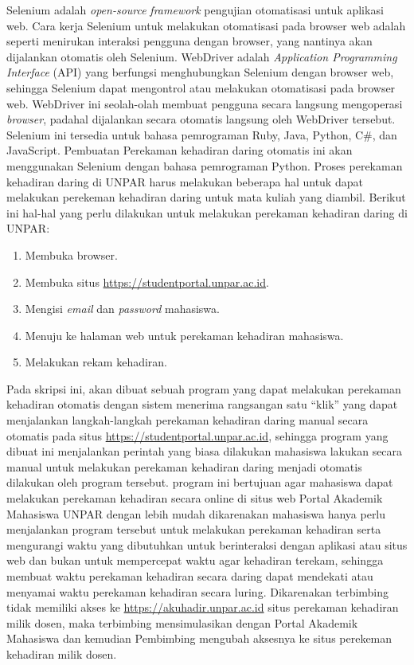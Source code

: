 Selenium adalah \textit{open-source} \textit{framework} pengujian otomatisasi untuk aplikasi web\cite{selenium}. Cara kerja Selenium untuk melakukan otomatisasi pada browser web adalah seperti menirukan interaksi pengguna dengan browser, yang nantinya akan dijalankan otomatis oleh Selenium. WebDriver adalah \textit{Application Programming Interface} (API) yang berfungsi menghubungkan Selenium dengan browser web, sehingga Selenium dapat mengontrol atau melakukan otomatisasi pada browser web. WebDriver ini seolah-olah membuat pengguna secara langsung mengoperasi \textit{browser}, padahal dijalankan secara otomatis langsung oleh WebDriver tersebut. Selenium ini tersedia untuk bahasa pemrograman Ruby, Java, Python, C\#, dan JavaScript. Pembuatan Perekaman kehadiran daring otomatis ini akan menggunakan Selenium dengan bahasa pemrograman Python.  
\newpage
Proses perekaman kehadiran daring di UNPAR harus melakukan beberapa hal untuk dapat melakukan perekeman kehadiran daring untuk mata kuliah yang diambil. Berikut ini hal-hal yang perlu dilakukan untuk melakukan perekaman kehadiran daring di UNPAR:
\begin{enumerate}
	\item Membuka browser.
	\item Membuka situs \url{https://studentportal.unpar.ac.id}.
	\item Mengisi \textit{email} dan \textit{password} mahasiswa.
	\item Menuju ke halaman web untuk perekaman kehadiran mahasiswa.
	\item Melakukan rekam kehadiran.
\end{enumerate}
Pada skripsi ini, akan dibuat sebuah program yang dapat melakukan perekaman kehadiran otomatis dengan sistem menerima rangsangan satu ``klik'' yang dapat menjalankan langkah-langkah perekaman kehadiran daring manual secara otomatis pada situs \url{https://studentportal.unpar.ac.id}, sehingga program yang dibuat ini menjalankan perintah yang biasa dilakukan mahasiswa lakukan secara manual untuk melakukan perekaman kehadiran daring menjadi otomatis dilakukan oleh program tersebut.
program ini bertujuan agar mahasiswa dapat melakukan perekaman kehadiran secara online di situs web Portal Akademik Mahasiswa UNPAR dengan lebih mudah dikarenakan mahasiswa hanya perlu menjalankan program tersebut untuk melakukan perekaman kehadiran serta mengurangi waktu yang dibutuhkan untuk berinteraksi dengan aplikasi atau situs web dan bukan untuk mempercepat waktu agar kehadiran terekam, sehingga membuat waktu perekaman kehadiran secara daring dapat mendekati atau menyamai waktu perekaman kehadiran secara luring. Dikarenakan terbimbing tidak memiliki akses ke \url{https://akuhadir.unpar.ac.id} situs perekaman kehadiran milik dosen, maka terbimbing mensimulasikan dengan Portal Akademik Mahasiswa dan kemudian Pembimbing mengubah aksesnya ke situs perekeman kehadiran milik dosen.


